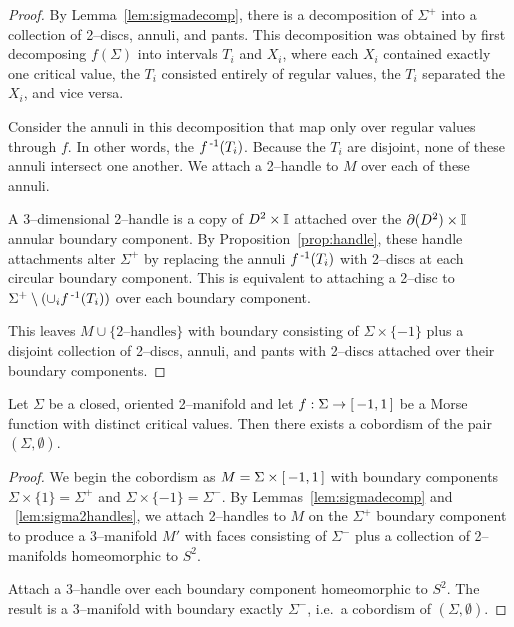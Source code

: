 \begin{proof}
	By Lemma~\ref{lem:sigmadecomp}, there is a decomposition of $\Sigma^+$ into a collection of 2--discs, annuli, and pants.
	This decomposition was obtained by first decomposing $f(\Sigma)$ into intervals $T_i$ and $X_i$, where each $X_i$ contained exactly one critical value, the $T_i$ consisted entirely of regular values, the $T_i$ separated the $X_i$, and vice versa.
	
	Consider the annuli in this decomposition that map only over regular values through $f$.
	In other words, the $f^{\,\text{-}1}(T_i)$.
	Because the $T_i$ are disjoint, none of these annuli intersect one another.
	We attach a 2--handle to $M$ over each of these annuli.
	
	A 3--dimensional 2--handle is a copy of $D^2\times\mathbb{I}$ attached over the $\partial(D^2)\times\mathbb{I}$ annular boundary component.
	By Proposition~\ref{prop:handle}, these handle attachments alter $\Sigma^+$ by replacing the annuli $f^{\,\text{-}1}(T_i)$ with 2--discs at each circular boundary component.
	This is equivalent to attaching a 2--disc to $\Sigma^+\setminus(\cup_i f^{\,\text{-}1}(T_i))$ over each boundary component.
	
	This leaves $M\cup\{\textrm{2--handles}\}$ with boundary consisting of $\Sigma\times\{-1\}$ plus a disjoint collection of 2--discs, annuli, and pants with 2--discs attached over their boundary components.	
\end{proof}

\begin{theorem}
	\label{thm:2bound3}
	Let $\Sigma$ be a closed, oriented 2--manifold and let $f:\Sigma\to[\,-1,1\,]$ be a Morse function with distinct critical values.
	Then there exists a cobordism of the pair $(\Sigma,\emptyset)$.
\end{theorem}

\begin{proof}
	We begin the cobordism as $M=\Sigma\times[\,-1,1\,]$ with boundary components $\Sigma\times\{1\}=\Sigma^+$ and $\Sigma\times\{-1\}=\Sigma^-$.
	By Lemmas~\ref{lem:sigmadecomp} and ~\ref{lem:sigma2handles}, we attach 2--handles to $M$ on the $\Sigma^+$ boundary component to produce a 3--manifold $M'$ with faces consisting of $\Sigma^-$ plus a collection of 2--manifolds homeomorphic to $S^2$.
	
	Attach a 3--handle over each boundary component homeomorphic to $S^2$.
	The result is a 3--manifold with boundary exactly $\Sigma^-$, i.e.\ a cobordism of $(\Sigma,\emptyset)$.
\end{proof}

